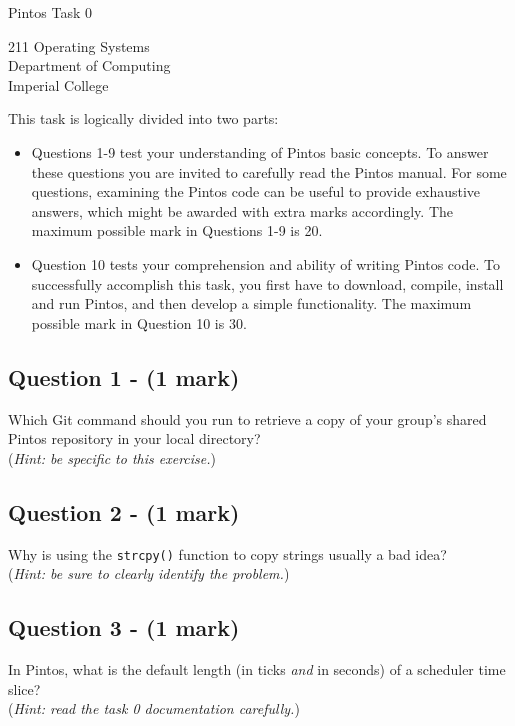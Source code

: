 \documentclass[a4paper,12pt]{article}
\begin{document}
\small

\begin{center}
\begin{LARGE}
Pintos Task 0
\end{LARGE}
\end{center}

\begin{center}
211 Operating Systems \\
Department of Computing \\
Imperial College
\end{center}

This task is logically divided into two parts:
\begin{itemize}
\item Questions 1-9 test your understanding of Pintos basic concepts. 
      To answer these questions you are invited to carefully read the Pintos manual. 
      For some questions, examining the Pintos code can be useful to provide exhaustive answers, which might be awarded with extra marks accordingly. 
      The maximum possible mark in Questions 1-9 is 20.
      
\item Question 10 tests your comprehension and ability of writing Pintos code. 
      To successfully accomplish this task, you first have to download, compile, install and run Pintos, and then develop a simple functionality. 
      The maximum possible mark in Question 10 is 30. 
\end{itemize}

\subsection*{Question 1 - (1 mark)}
Which Git command should you run to retrieve a copy of your group's shared Pintos repository in your local directory?\\
(\textit{Hint: be specific to this exercise.})

\subsection*{Question 2 - (1 mark)}
Why is using the {\tt strcpy()} function to copy strings usually a bad idea? \\
(\textit{Hint: be sure to clearly identify the problem.}) \\

\subsection*{Question 3 - (1 mark)}
In Pintos, what is the default length (in ticks \emph{and} in seconds) of a scheduler time slice? \\
(\textit{Hint: read the task 0 documentation carefully.}) \\
\end{document}
